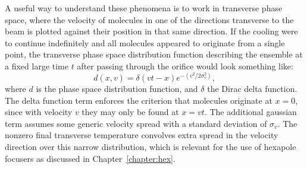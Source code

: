 A useful way to understand these phenomena is to work in transverse phase space, where the velocity of molecules in one of the directions transverse to the beam is plotted against their position in that same direction.
If the cooling were to continue indefinitely and all molecules appeared to originate from a single point, the transverse phase space distribution function describing the ensemble at a fixed large time $t$ after passing through the orifice would look something like:
\begin{equation}
d(x,v) = \delta(vt-x)e^{- (v^2/2\sigma_v^2)},
\end{equation}
where $d$ is the phase space distribution function, and $\delta$ the Dirac delta function. 
The delta function term enforces the criterion that molecules originate at $x=0$, since with velocity $v$ they may only be found at $x = vt$. 
The additional gaussian term assumes some generic velocity spread with a standard deviation of $\sigma_v$.
The nonzero final transverse temperature convolves extra spread in the velocity direction over this narrow distribution, which is relevant for the use of hexapole focusers as discussed in Chapter~\ref{chapter:hex}.

